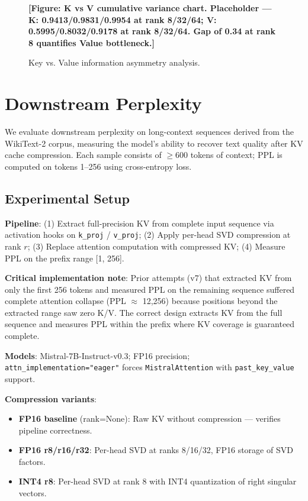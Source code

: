 \documentclass[11pt, a4paper, oneside]{article}
\theoremstyle{myplain}
\theoremstyle{mydefinition}
\theoremstyle{myremark}
\begin{document}
\begin{figure}[t]
    \centering
    \textbf{[Figure: K vs V cumulative variance chart. Placeholder — K: 0.9413/0.9831/0.9954 at rank 8/32/64; V: 0.5995/0.8032/0.9178 at rank 8/32/64. Gap of 0.34 at rank 8 quantifies Value bottleneck.]}
    \caption{Key vs. Value information asymmetry analysis.}
    \label{fig:k_v_asymmetry}
\end{figure}

\FloatBarrier

\section{Downstream Perplexity}
\label{sec:ppl}

We evaluate downstream perplexity on long-context sequences derived from the WikiText-2 corpus, measuring the model's ability to recover text quality after KV cache compression. Each sample consists of $\ge$600 tokens of context; PPL is computed on tokens 1--256 using cross-entropy loss.

\subsection{Experimental Setup}

\textbf{Pipeline}: (1) Extract full-precision KV from complete input sequence via activation hooks on \texttt{k\_proj} / \texttt{v\_proj}; (2) Apply per-head SVD compression at rank $r$; (3) Replace attention computation with compressed KV; (4) Measure PPL on the prefix range [1, 256].

\textbf{Critical implementation note}: Prior attempts (v7) that extracted KV from only the first 256 tokens and measured PPL on the remaining sequence suffered complete attention collapse (PPL $\approx$ 12,256) because positions beyond the extracted range saw zero K/V. The correct design extracts KV from the full sequence and measures PPL within the prefix where KV coverage is guaranteed complete.

\textbf{Models}: Mistral-7B-Instruct-v0.3; FP16 precision; \texttt{attn\_implementation="eager"} forces \texttt{MistralAttention} with \texttt{past\_key\_value} support.

\textbf{Compression variants}:
\begin{itemize}
    \item \textbf{FP16 baseline} (rank=None): Raw KV without compression — verifies pipeline correctness.
    \item \textbf{FP16 r8/r16/r32}: Per-head SVD at ranks 8/16/32, FP16 storage of SVD factors.
    \item \textbf{INT4 r8}: Per-head SVD at rank 8 with INT4 quantization of right singular vectors.
\end{itemize}
\end{document}
